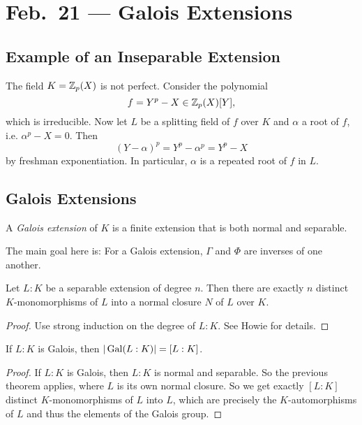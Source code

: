 \chapter{Feb.~21 --- Galois Extensions}

\section{Example of an Inseparable Extension}

\begin{example}
  The field $K = \mathbb{Z}_p(X)$ is not perfect. Consider
  the polynomial
  \[
    f = Y^p - X \in \mathbb{Z}_p(X)[Y],
  \]
  which is irreducible. Now let $L$ be a splitting
  field of $f$ over $K$ and $\alpha$ a root of $f$,
  i.e. $\alpha^p - X = 0$. Then
  \[
    (Y - \alpha)^p = Y^p - \alpha^p = Y^p - X
  \]
  by freshman exponentiation. In particular,
  $\alpha$ is a repeated root of $f$ in $L$.
\end{example}

\section{Galois Extensions}

\begin{definition}
  A \emph{Galois extension} of $K$ is a finite extension
  that is both normal and separable.
\end{definition}

\begin{remark}
  The main goal here is: For a Galois extension,
  $\Gamma$ and $\Phi$ are inverses of one another.
\end{remark}

\begin{theorem}
  Let $L : K$ be a separable extension of degree
  $n$. Then there are exactly $n$ distinct
  $K$-monomorphisms of $L$ into a normal closure $N$
  of $L$ over $K$.
\end{theorem}

\begin{proof}
  Use strong induction on the degree of $L : K$.
  See Howie for details.
\end{proof}

\begin{corollary}
  \label{cor:galois-size}
  If $L : K$ is Galois, then
  $|\operatorname{Gal}(L : K)| = [L : K]$.
\end{corollary}

\begin{proof}
  If $L : K$ is Galois, then $L : K$ is normal
  and separable. So the previous theorem applies,
  where $L$ is its own normal closure. So we get exactly
  $[L : K]$ distinct $K$-monomorphisms of $L$ into $L$,
  which are precisely the $K$-automorphisms of $L$ and
  thus the elements of the Galois group.
\end{proof}

